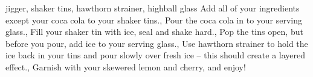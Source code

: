 %
{jigger, shaker tins, hawthorn strainer, highball glass}
%
{
    Add all of your ingredients except your coca cola to your shaker tins.,
    Pour the coca cola in to your serving glass.,
    Fill your shaker tin with ice, seal and shake hard.,
    Pop the tins open, but before you pour, add ice to your serving glass.,
    Use hawthorn strainer to hold the ice back in your tins and pour slowly over fresh ice – this should create a layered effect.,
    Garnish with your skewered lemon and cherry, and enjoy!
}





\cocktail{}{

}
%
{}
%
{

}



